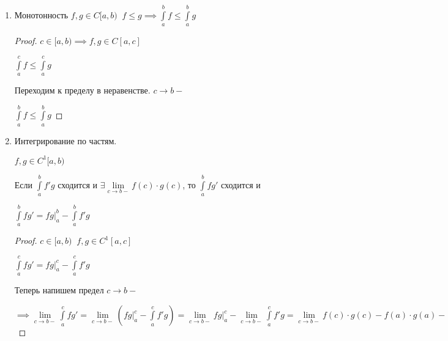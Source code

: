 \begin{properties}
\begin{enumerate}
\begin{proof}
			$\implies$ предел существует, конечен $\implies$ интеграл сходится и
			
			$\int\limits_a^b(\alpha f + \beta g)= \alpha \int\limits_a^b f +\beta \int\limits_a^b g$ 
		\end{proof}
	
		\begin{remark}\slashns
		
			$\int\limits_a^b f$ сходится $\int\limits_a^b g$ расходится $\implies \int\limits_a^b (f \pm g)$ расходится. 
		
			Доказательство -- от противного.
		\end{remark}
	
		\item
		Монотонность $f, g \in C[a,b) \;\; f\le g \implies \int\limits_a^b f \le \int\limits_a^b g$
	
		\begin{proof}\slashns
		
			$c \in [a,b) \implies f,g \in C[a,c]$
			
			$\int\limits_a^c f \le \int\limits_a^c g$
			
			Переходим к пределу в неравенстве. $c \to b-$
			
			$\int\limits_a^b f \le \int\limits_a^b g$
			
		\end{proof}
		
		\item Интегрирование по частям.  
		
		$f, g \in C^1[a,b)$
		
		Если $\int\limits_a^b f'g$ сходится и $\exists \lim\limits_{c \to b-} f(c)\cdot g(c)$, то $\int\limits_a^b fg'$ сходится и
		
		$\int\limits_a^b fg' = fg \Big|_a^b - \int\limits_a^b f'g$
		
		\begin{proof}\slashns
			
			$c \in [a,b) \;\; f,g \in C^1[a,c]$
			
			$\int\limits_{a}^{c} fg' =  fg\Big|_a^c - \int\limits_a^c f'g$
			
			Теперь напишем предел $c \to b-$
			
			$\implies \lim\limits_{c \to b-} \int\limits_a^c fg' = \lim\limits_{c \to b-} (fg\Big|_a^c - \int\limits_a^c f'g) =
			 \lim\limits_{c \to b-} fg\Big|_a^c - \lim\limits_{c \to b-}\int\limits_a^c f'g =  \lim\limits_{c \to b-} f(c)\cdot g(c) - f(a) \cdot g(a) -  \int\limits_a^b f'g$
			

\end{proof}
\end{enumerate}
\end{properties}
